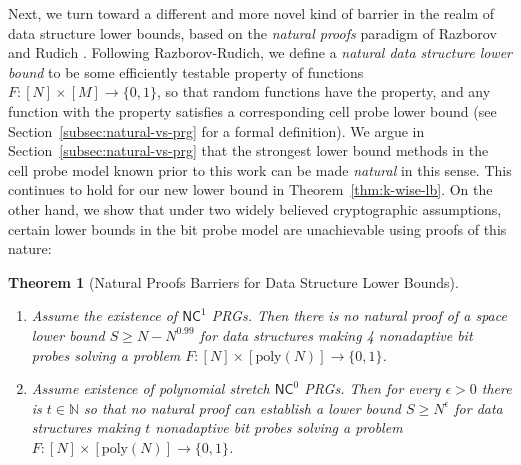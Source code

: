 \documentclass[11pt]{article}
\newtheorem{theorem}{Theorem}
\newcommand{\B}{\{0,1\}}
\newcommand{\poly}{\mathrm{poly}}
\begin{document}
Next, we turn toward a different and more novel kind of barrier in the realm of data structure lower bounds, based on the \emph{natural proofs} paradigm of Razborov and Rudich \cite{natural-proofs}. Following Razborov-Rudich, we define a \emph{natural data structure lower bound} to be some efficiently testable property of functions $F:[N] \times [M] \to \B$, so that random functions have the property, and any function with the property satisfies a corresponding cell probe lower bound (see Section~\ref{subsec:natural-vs-prg} for a formal definition).
We argue in Section~\ref{subsec:natural-vs-prg} that the strongest lower bound methods in the cell probe model known prior to this work can be made \emph{natural} in this sense. This continues to hold for our new lower bound in Theorem~\ref{thm:k-wise-lb}.
On the other hand, we show that under two widely believed cryptographic assumptions, certain lower bounds in the bit probe model are unachievable using proofs of this nature:
\begin{theorem}[Natural Proofs Barriers for Data Structure Lower Bounds]
\label{thm:nat-prop-barrier}
~
\begin{enumerate}
    \item Assume the existence of $\mathsf{NC}^1$ PRGs. Then there is no natural proof of a space lower bound $S \geq N - N^{0.99}$ for data structures making 4 nonadaptive bit probes solving a problem $F: [N] \times [\poly(N)] \to \B$.
    \item Assume existence of polynomial stretch $\mathsf{NC}^0$ PRGs. Then for every $\epsilon>0$ there is $t \in \mathbb{N}$ so that no natural proof can establish a lower bound $S \geq N^{\epsilon}$ for data structures making $t$ nonadaptive bit probes solving a problem $F: [N] \times [\poly(N)] \to \B$.
\end{enumerate}
\end{theorem}
\end{document}
